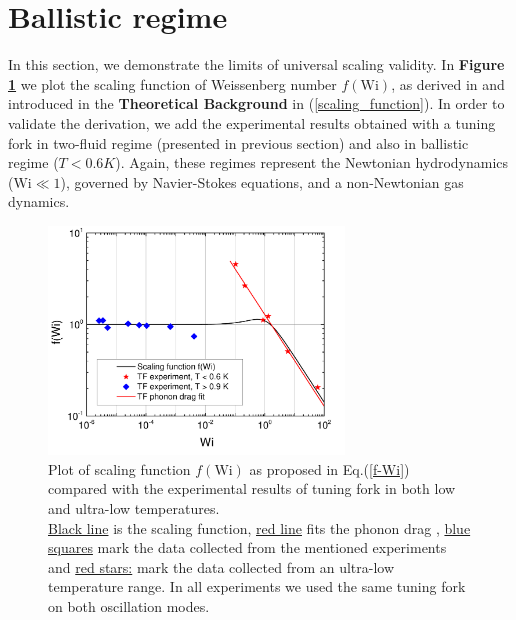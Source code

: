 \section{Ballistic regime}

In this section, we demonstrate the limits of universal scaling validity. In \textbf{Figure \ref{ballistic}} we plot the scaling function of Weissenberg number $f(\text{Wi})$, as derived in \cite{scaling_function} and introduced in the \textbf{Theoretical Background} in (\ref{scaling_function}). In order to validate the derivation, we add the experimental results obtained with a tuning fork in two-fluid regime (presented in previous section) and also in ballistic regime ($T < 0.6\unit{K}$).
Again, these regimes represent the Newtonian hydrodynamics ($\text{Wi} \ll 1$), governed by Navier-Stokes equations, and a non-Newtonian gas dynamics. \cite{universal_scaling}

\begin{figure}[h]
	\centering
	\includegraphics[width=0.7\textwidth]{graphics/results/ballistic_regime}
	\caption{Plot of scaling function $f(\text{Wi})$ as proposed in Eq.(\ref{f-Wi}) compared with the experimental results of tuning fork in both low and ultra-low temperatures.\\
	\underline{Black line} is the scaling function, \underline{red line} fits the phonon drag \cite{universal_scaling}, \underline{blue squares} mark the data collected from the mentioned experiments and \underline{red stars:} mark the data collected from an ultra-low temperature range. In all experiments we used the same tuning fork on both oscillation modes.}
	\label{ballistic}
\end{figure}


